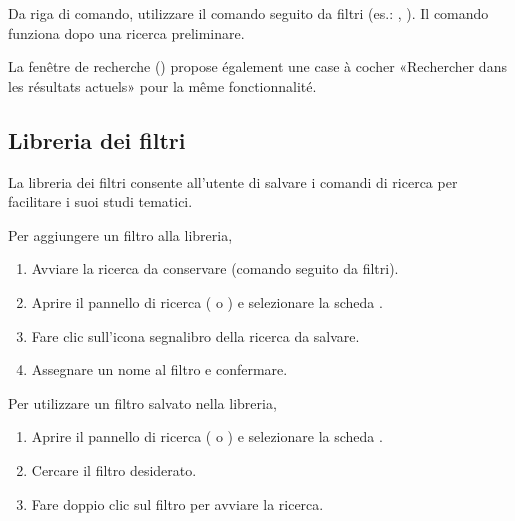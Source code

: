 \documentclass[letterpaper,10pt,italian]{sphinxmanual}
\begin{document}
\sphinxAtStartPar
Da riga di comando, utilizzare il comando  seguito da filtri (es.: , ). Il comando  funziona dopo una ricerca preliminare.

\sphinxAtStartPar
La fenêtre de recherche () propose également une case à cocher
«Rechercher dans les résultats actuels» pour la même fonctionnalité.


\subsection{Libreria dei filtri}
\label{\detokenize{annexe_filtres:bibliotheque-de-filtres}}
\sphinxAtStartPar
La libreria dei filtri consente all’utente di salvare i comandi di ricerca per facilitare i suoi studi tematici.

\sphinxAtStartPar
Per aggiungere un filtro alla libreria,
\begin{enumerate}
%
\item {} 
\sphinxAtStartPar
Avviare la ricerca da conservare (comando  seguito da filtri).

\item {} 
\sphinxAtStartPar
Aprire il pannello di ricerca ( o ) e selezionare la scheda .

\item {} 
\sphinxAtStartPar
Fare clic sull’icona segnalibro della ricerca da salvare.

\item {} 
\sphinxAtStartPar
Assegnare un nome al filtro e confermare.

\end{enumerate}

\sphinxAtStartPar
Per utilizzare un filtro salvato nella libreria,
\begin{enumerate}
%
\item {} 
\sphinxAtStartPar
Aprire il pannello di ricerca ( o ) e selezionare la scheda .

\item {} 
\sphinxAtStartPar
Cercare il filtro desiderato.

\item {} 
\sphinxAtStartPar
Fare doppio clic sul filtro per avviare la ricerca.

\end{enumerate}
\end{document}
